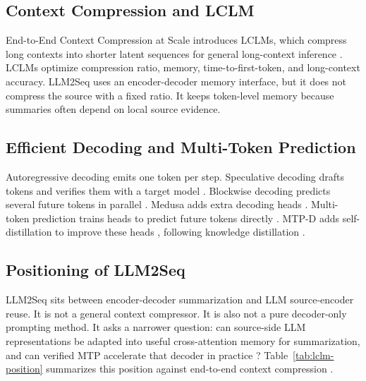 \documentclass[11pt]{article}
\begin{document}
\subsection{Context Compression and LCLM}

End-to-End Context Compression at Scale introduces LCLMs, which compress long contexts into shorter latent sequences for general long-context inference \citep{li2026contextcompression}.
LCLMs optimize compression ratio, memory, time-to-first-token, and long-context accuracy.
LLM2Seq uses an encoder-decoder memory interface, but it does not compress the source with a fixed ratio.
It keeps token-level memory because summaries often depend on local source evidence.

\subsection{Efficient Decoding and Multi-Token Prediction}

Autoregressive decoding emits one token per step.
Speculative decoding drafts tokens and verifies them with a target model \citep{leviathan2023speculative}.
Blockwise decoding predicts several future tokens in parallel \citep{stern2018blockwise}.
Medusa adds extra decoding heads \citep{cai2024medusa}.
Multi-token prediction trains heads to predict future tokens directly \citep{gloeckle2024mtp}.
MTP-D adds self-distillation to improve these heads \citep{zhao2026mtpdistill}, following knowledge distillation \citep{hinton2015distilling}.

\subsection{Positioning of LLM2Seq}

LLM2Seq sits between encoder-decoder summarization and LLM source-encoder reuse.
It is not a general context compressor.
It is also not a pure decoder-only prompting method.
It asks a narrower question: can source-side LLM representations be adapted into useful cross-attention memory for summarization, and can verified MTP accelerate that decoder in practice \citep{gloeckle2024mtp,zhao2026mtpdistill}?
Table~\ref{tab:lclm-position} summarizes this position against end-to-end context compression \citep{li2026contextcompression}.
\end{document}
